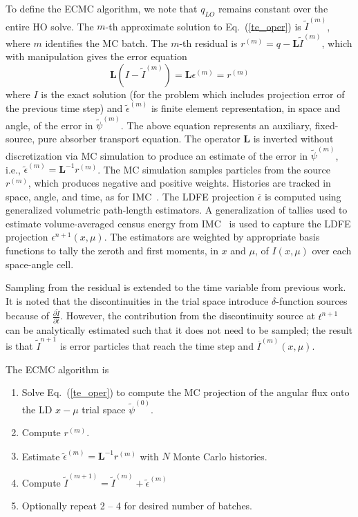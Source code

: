 \documentclass{anstrans}
\renewcommand{\eqref}[1]{(\ref{#1})}
\newcommand{\pderiv}[2]{\frac{\partial #1}{\partial #2}}
\newcommand{\B}[1]{\ensuremath{\mathbf{#1}}}
\begin{document}
To define the ECMC algorithm, we note that $q_{LO}$ remains constant over the entire HO solve.
The $m$-th approximate solution to Eq.~\eqref{te_oper} is $\tilde{I}^{(m)}$, where
$m$ identifies the MC batch.
The $m$-th residual is $r^{(m)} = q - \B L\tilde{I}^{(m)}$, which with manipulation gives the error equation
\begin{equation}
\B L (I - \tilde{I}^{(m)}) = \B L {\epsilon}^{(m)} = r^{(m)}
\end{equation}
where $I$ is the exact solution (for the problem which includes projection error of the
previous time step) and $\tilde{\epsilon}^{(m)}$ is finite element
representation, in space and angle, of the error in
$\tilde{\psi}^{(m)}$. The above equation represents an auxiliary, fixed-source, pure
absorber transport equation.
The operator $\B L$ is inverted without discretization via MC simulation to produce an
estimate of the error in $\tilde{\psi}^{(m)}$, i.e., $\tilde{\epsilon}^{(m)} = \B
L^{-1} r^{(m)}$.  The MC simulation samples particles from the source $r^{(m)}$, which
produces negative and positive weights.  Histories are tracked in space, angle, and time, as for IMC~\cite{wollaber_review}.
The LDFE projection $\overline{\epsilon}$ is computed using generalized volumetric path-length estimators. 
A generalization of tallies used to estimate volume-averaged census energy
from IMC~\cite{wollaber_review} is used to capture the LDFE projection
$\epsilon^{n+1}(x,\mu)$.  The estimators are weighted by appropriate basis
functions to tally the zeroth and first moments, in $x$ and $\mu$, of $I(x,\mu)$ over each
space-angle cell.  

Sampling from the residual is extended to the time variable from previous work.  It is
noted that the discontinuities in the trial space introduce $\delta$-function sources
because of $\pderiv{\tilde{I}}{t}$.  
However, the contribution from the discontinuity source at $t^{n+1}$ can be analytically
estimated such that it does not need to be sampled; the result is that $\tilde I^{n+1}$ is
error particles that reach the time step and $\overline I^{(m)}(x,\mu)$.  

  The ECMC algorithm is
\begin{enumerate}
\item Solve Eq.~\eqref{te_oper} to compute the MC projection of the angular
flux onto the LD $x-\mu$ trial space $\tilde\psi^{(0)}$.
\item Compute $r^{(m)}$.
\item Estimate $\tilde{\epsilon}^{(m)} = \B L^{-1} r^{(m)}$ with $N$ Monte Carlo histories.
\item Compute $\tilde I^{(m+1)} = \tilde I^{(m)}
+ \tilde\epsilon^{(m)}$
\item Optionally repeat 2 -- 4 for desired number of batches.
\end{enumerate}
\end{document}
